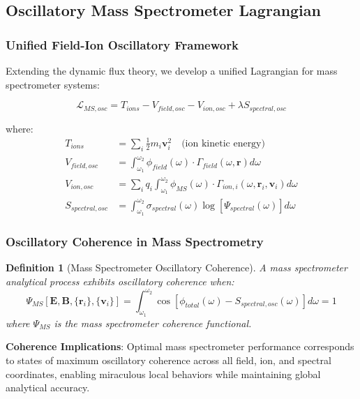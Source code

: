 \documentclass[11pt,a4paper]{article}
\newtheorem{definition}[theorem]{Definition}
\theoremstyle{remark}
\begin{document}
\subsection{Oscillatory Mass Spectrometer Lagrangian}

\subsubsection{Unified Field-Ion Oscillatory Framework}

Extending the dynamic flux theory, we develop a unified Lagrangian for mass spectrometer systems:

\begin{equation}
\mathcal{L}_{MS,osc} = T_{ions} - V_{field,osc} - V_{ion,osc} + \lambda S_{spectral,osc}
\end{equation}

where:
\begin{align}
T_{ions} &= \sum_i \frac{1}{2}m_i \mathbf{v}_i^2 \quad \text{(ion kinetic energy)}\\
V_{field,osc} &= \int_{\omega_1}^{\omega_2} \phi_{field}(\omega) \cdot \Gamma_{field}(\omega, \mathbf{r}) d\omega\\
V_{ion,osc} &= \sum_i q_i \int_{\omega_1}^{\omega_2} \phi_{MS}(\omega) \cdot \Gamma_{ion,i}(\omega, \mathbf{r}_i, \mathbf{v}_i) d\omega\\
S_{spectral,osc} &= \int_{\omega_1}^{\omega_2} \sigma_{spectral}(\omega) \log[\Psi_{spectral}(\omega)] d\omega
\end{align}

\subsubsection{Oscillatory Coherence in Mass Spectrometry}

\begin{definition}[Mass Spectrometer Oscillatory Coherence]
A mass spectrometer analytical process exhibits oscillatory coherence when:
\begin{equation}
\Psi_{MS}[\mathbf{E}, \mathbf{B}, \{\mathbf{r}_i\}, \{\mathbf{v}_i\}] = \int_{\omega_1}^{\omega_2} \cos[\phi_{total}(\omega) - S_{spectral,osc}(\omega)] d\omega = 1
\end{equation}
where $\Psi_{MS}$ is the mass spectrometer coherence functional.
\end{definition}

\textbf{Coherence Implications}: Optimal mass spectrometer performance corresponds to states of maximum oscillatory coherence across all field, ion, and spectral coordinates, enabling miraculous local behaviors while maintaining global analytical accuracy.
\end{document}
